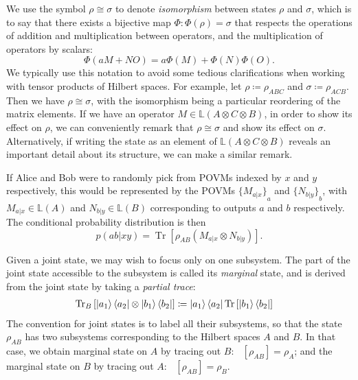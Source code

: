 \documentclass[10pt, a4paper]{article}
\numberwithin{equation}{section} %
\theoremstyle{definition}
\theoremstyle{plain}
\newcommand{\?}{\mathrel{?}} %
\newcommand{\Lin}[1]{\mathbb{L}\left(#1\right)}
\newcommand{\Tr}[2][]{\mathop{\mathrm{Tr}#1}\left[ #2 \right]} %
\begin{document}
\begin{appendices}
                    We use the symbol \(\rho \cong \sigma\) to denote \emph{isomorphism} between states \(\rho\) and \(\sigma\), which is to say that there exists a bijective map \(\Phi : \Phi(\rho) = \sigma\) that respects the operations of addition and multiplication between operators, and the multiplication of operators by scalars:
                    \begin{equation}
                      \Phi(aM + NO) = a\Phi(M) + \Phi(N)\Phi(O).
                    \end{equation}
                    We typically use this notation to avoid some tedious clarifications when working with tensor products of Hilbert spaces. For example, let \(\rho \coloneqq \rho_{ABC}\) and \(\sigma \coloneqq \rho_{ACB}\). Then we have \(\rho \cong \sigma\), with the isomorphism being a particular reordering of the matrix elements. If we have an operator \(M \in \Lin{A \otimes C \otimes B}\), in order to show its effect on \(\rho\), we can conveniently remark that \(\rho \cong \sigma\) and show its effect on \(\sigma\). Alternatively, if writing the state as an element of \(\Lin{A \otimes C \otimes B}\) reveals an important detail about its structure, we can make a similar remark.

                    If Alice and Bob were to randomly pick from POVMs indexed by \(x\) and \(y\) respectively, this would be represented by the POVMs \({\{M_{a|x}\}}_a\) and \({\{N_{b|y}\}}_b\), with \(M_{a|x} \in \Lin{A}\) and \(N_{b|y} \in \Lin{B}\) corresponding to outputs \(a\) and \(b\) respectively. The conditional probability distribution is then
                    \begin{equation}
                      p(ab|xy) = \Tr{\rho_{AB} \left(M_{a|x} \otimes N_{b|y}\right) }.
                    \end{equation}

                    Given a joint state, we may wish to focus only on one subsystem. The part of the joint state accessible to the subsystem is called its \emph{marginal} state, and is derived from the joint state by taking a \emph{partial trace}:
                    \begin{align}
                      \Tr[_B]{\ket{a_1}\bra{a_2} \otimes \ket{b_1}\bra{b_2}} &\coloneqq \ket{a_1}\bra{a_2} \Tr{\ket{b_1}\bra{b_2}}
                    \end{align}
                    The convention for joint states is to label all their subsystems, so that the state \(\rho_{AB}\) has two subsystems corresponding to the Hilbert spaces \(A\) and \(B\). In that case, we obtain marginal state on \(A\) by tracing out \(B\): \(\Tr[_B]{\rho_{AB}} = \rho_{A}\); and the marginal state on \(B\) by tracing out \(A\): \(\Tr[_A]{\rho_{AB}} = \rho_{B}\).


\end{appendices}
\end{document}
